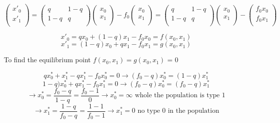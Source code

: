 \[ \begin{pmatrix}
         x'_0\\
         x'_1\\
       \end{pmatrix}  = 
       \begin{pmatrix}
                q & 1-q\\
                1-q & q\\
              \end{pmatrix}
              \begin{pmatrix}
                             x_0\\
                              x_1\\
                            \end{pmatrix} - f_0 \begin{pmatrix}
                                            x_0\\
                                            x_1\\
                                          \end{pmatrix} =        \begin{pmatrix}
                                                          q & 1-q\\
                                                          1-q & q\\
                                                        \end{pmatrix}
                                                        \begin{pmatrix}
                                                                       x_0\\
                                                                        x_1\\
                                                                      \end{pmatrix} - \begin{pmatrix}
                                                                                                   f_0x_0\\
                                                                                                   f_0x_1\\
                                                                                                 \end{pmatrix}\] 

\[  x'_0 = qx_0 + (1-q)x_1 -f_0x_0 = f(x_{0}, x_1)\]
\[  x'_1 = (1-q)x_0+qx_1-f_0x_1 = g(x_0,x_1)\]

To find the equilibrium point $f(x_0, x_1) = g(x_0, x_1)$ = 0

\[ qx^*_0 + x^*_1 -qx^*_1 - f_0x^*_0 = 0 \rightarrow (f_0-q)x^*_0 = (1-q)x^*_1\]
\[ 1-q)x^*_0+qx^*_1-f_0x^*_1 = 0 \rightarrow (f_0-q)x^*_0 = (f_0-q)x^*_1\]
\[ \rightarrow x^*_0 = \frac{f_0-q}{1-q}= \frac{f_0-1}{0} \rightarrow x^*_0 = \infty \text{ whole the population is type 1}\]
\[ \rightarrow x^*_1 = \frac{1-q}{f_0-q}= \frac{1-1}{f_0-1} \rightarrow x^*_1 = 0 \text{ no type 0 in the population}\]